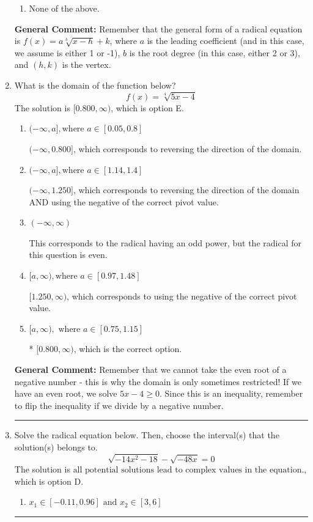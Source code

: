 \documentclass{extbook}[14pt]
\newcommand{\litem}[1]{\item #1

\rule{\textwidth}{0.4pt}}
\begin{document}
\begin{enumerate}
{\begin{enumerate}[label=\Alph*.]
\begin{multicols}{2}
\end{multicols}\item None of the above.\end{enumerate}
\textbf{General Comment:} Remember that the general form of a radical equation is $ f(x) = a \sqrt[b]{x - h} + k $, where $a$ is the leading coefficient (and in this case, we assume is either 1 or -1), $b$ is the root degree (in this case, either 2 or 3), and $(h, k)$ is the vertex.
}
\litem{
What is the domain of the function below?
\[ f(x) = \sqrt[4]{5 x - 4} \]The solution is \( [0.800, \infty) \), which is option E.\begin{enumerate}[label=\Alph*.]
\item \( (-\infty, a], \text{where } a \in [0.05, 0.8] \)

 $(-\infty, 0.800]$, which corresponds to reversing the direction of the domain.
\item \( (-\infty, a], \text{where } a \in [1.14, 1.4] \)

$(-\infty, 1.250]$, which corresponds to reversing the direction of the domain AND using the negative of the correct pivot value.
\item \( (-\infty, \infty) \)

This corresponds to the radical having an odd power, but the radical for this question is even.
\item \( [a, \infty), \text{where } a \in [0.97, 1.48] \)

$[1.250, \infty)$, which corresponds to using the negative of the correct pivot value.
\item \( [a, \infty), \text{ where } a \in [0.75, 1.15] \)

* $[0.800, \infty)$, which is the correct option.
\end{enumerate}

\textbf{General Comment:} Remember that we cannot take the even root of a negative number - this is why the domain is only sometimes restricted! If we have an even root, we solve $5 x - 4 \geq 0$. Since this is an inequality, remember to flip the inequality if we divide by a negative number.
}
\litem{
Solve the radical equation below. Then, choose the interval(s) that the solution(s) belongs to.
\[ \sqrt{-14 x^2 - 18} - \sqrt{-48 x} = 0 \]The solution is \( \text{all potential solutions lead to complex values in the equation.} \), which is option D.\begin{enumerate}[label=\Alph*.]
\item \( x_1 \in [-0.11, 0.96] \text{ and } x_2 \in [3,6] \)


\end{enumerate}}
\end{enumerate}
\end{document}
